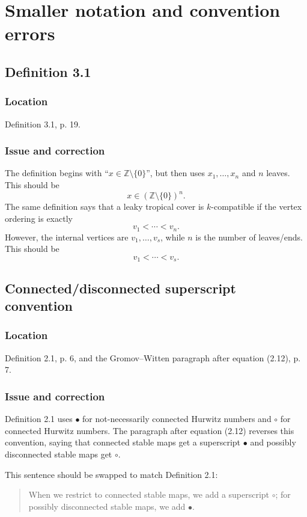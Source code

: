 \documentclass[11pt]{article}
\newcommand{\Z}{\mathbb{Z}}
\begin{document}
\section{Smaller notation and convention errors}

\subsection{Definition 3.1}

\subsubsection*{Location}
Definition 3.1, p. 19.

\subsubsection*{Issue and correction}
The definition begins with ``$x\in\Z\setminus\{0\}$'', but then uses $x_1,\ldots,x_n$ and $n$ leaves.  This should be
\[
   x\in(\Z\setminus\{0\})^n.
\]
The same definition says that a leaky tropical cover is $k$-compatible if the vertex ordering is exactly
\[
   v_1<\cdots<v_n.
\]
However, the internal vertices are $v_1,\ldots,v_s$, while $n$ is the number of leaves/ends.  This should be
\[
   v_1<\cdots<v_s.
\]

\subsection{Connected/disconnected superscript convention}

\subsubsection*{Location}
Definition 2.1, p. 6, and the Gromov--Witten paragraph after equation (2.12), p. 7.

\subsubsection*{Issue and correction}
Definition 2.1 uses $\bullet$ for not-necessarily connected Hurwitz numbers and $\circ$ for connected Hurwitz numbers.  The paragraph after equation (2.12) reverses this convention, saying that connected stable maps get a superscript $\bullet$ and possibly disconnected stable maps get $\circ$.

This sentence should be swapped to match Definition 2.1:
\begin{quote}
When we restrict to connected stable maps, we add a superscript $\circ$; for possibly disconnected stable maps, we add $\bullet$.
\end{quote}
\end{document}
